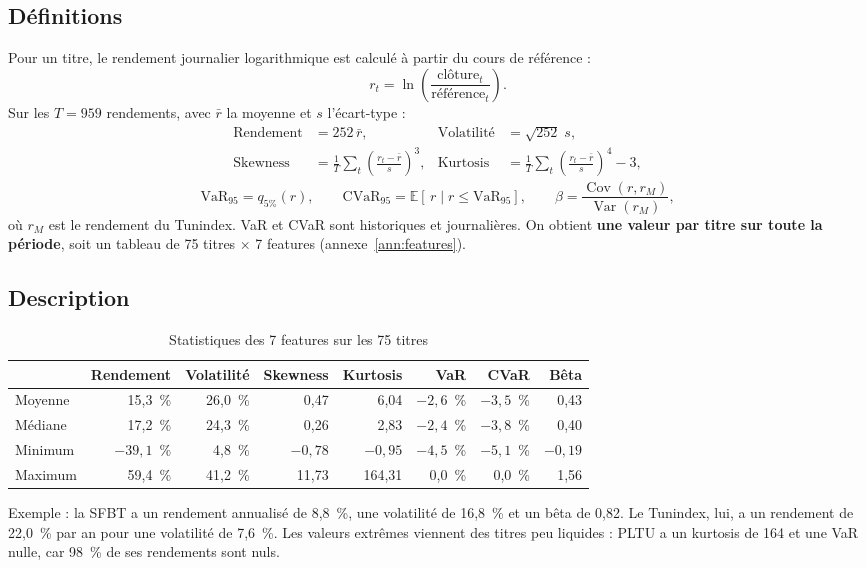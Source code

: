 \documentclass[11pt,a4paper]{article}
\newcommand{\pc}{~\%}
\begin{document}
\subsection{Définitions}
Pour un titre, le rendement journalier logarithmique est calculé à partir du cours de référence :
\begin{equation}
r_t = \ln\!\left(\frac{\text{clôture}_t}{\text{référence}_t}\right).
\end{equation}
Sur les $T = 959$ rendements, avec $\bar r$ la moyenne et $s$ l'écart-type :
\begin{align}
\text{Rendement} &= 252\,\bar r, & \text{Volatilité} &= \sqrt{252}\; s, \\
\text{Skewness} &= \frac{1}{T}\sum_t \left(\frac{r_t-\bar r}{s}\right)^{3}, & \text{Kurtosis} &= \frac{1}{T}\sum_t \left(\frac{r_t-\bar r}{s}\right)^{4} - 3,
\end{align}
\begin{equation}
\text{VaR}_{95} = q_{5\%}(r), \qquad \text{CVaR}_{95} = \mathbb{E}\left[\,r \mid r \leq \text{VaR}_{95}\right], \qquad
\beta = \frac{\operatorname{Cov}(r, r_M)}{\operatorname{Var}(r_M)},
\end{equation}
où $r_M$ est le rendement du Tunindex. VaR et CVaR sont historiques et journalières. On obtient \textbf{une valeur par titre sur toute la période}, soit un tableau de 75 titres $\times$ 7 features (annexe~\ref{ann:features}).

\subsection{Description}
\begin{table}[H]\centering\small
\caption{Statistiques des 7 features sur les 75 titres}\label{tab:desc-features}
\begin{tabular}{lrrrrrrr}\toprule
 & Rendement & Volatilité & Skewness & Kurtosis & VaR & CVaR & Bêta \\ \midrule
Moyenne & 15,3\pc{} & 26,0\pc{} & 0,47 & 6,04 & $-2{,}6$\pc{} & $-3{,}5$\pc{} & 0,43 \\
Médiane & 17,2\pc{} & 24,3\pc{} & 0,26 & 2,83 & $-2{,}4$\pc{} & $-3{,}8$\pc{} & 0,40 \\
Minimum & $-39{,}1$\pc{} & 4,8\pc{} & $-0{,}78$ & $-0{,}95$ & $-4{,}5$\pc{} & $-5{,}1$\pc{} & $-0{,}19$ \\
Maximum & 59,4\pc{} & 41,2\pc{} & 11,73 & 164,31 & 0,0\pc{} & 0,0\pc{} & 1,56 \\
\bottomrule\end{tabular}
\end{table}
Exemple : la SFBT a un rendement annualisé de 8,8\pc{}, une volatilité de 16,8\pc{} et un bêta de 0,82. Le Tunindex, lui, a un rendement de 22,0\pc{} par an pour une volatilité de 7,6\pc{}. Les valeurs extrêmes viennent des titres peu liquides : PLTU a un kurtosis de 164 et une VaR nulle, car 98\pc{} de ses rendements sont nuls.
\end{document}
